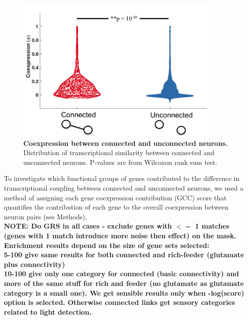 \documentclass[10pt,letterpaper]{article}
\begin{document}
\begin{figure}[!h]
   \centering
    \includegraphics[width=0.9\textwidth]{ConUnconChemicalFINAL}
 \caption{{\bf Coexpression between connected and unconnected neurons.} 
Distribution of transcriptional similarity between connected and unconnected neurons. P-values are from Wilcoxon rank sum test.}
 \label{ConUncon}
 \end{figure}
To investigate which functional groups of genes contributed to the difference in transcriptional coupling between connected and unconnected neurons, we used a method of assigning each gene coexpression contribution (GCC) score that quantifies the contribution of each gene to the overall coexpression between neuron pairs (see Methods).  \\ 

\textbf{NOTE: Do GRS in all cases - exclude genes with $<=$ 1 matches (genes with 1 match introduce more noise then effect) on the mask. 
Enrichment results depend on the size of gene sets selected: \\
5-100 give same results for both connected and rich-feeder (glutamate plus connectivity)\\
10-100 give only one category for connected (basic connectivity) and more of the same stuff for rich and feeder (no glutamate as glutamate category is a small one).
We get sensible results only when -log(score) option is selected. 
Otherwise connected links get sensory categories related to light detection.}. 
\end{document}
